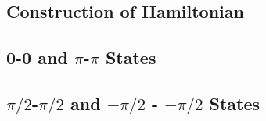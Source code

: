 \documentclass[../../../main.tex]{subfiles}
\begin{document}
\tableofcontents
\newpage

\subsection{Construction of Hamiltonian}


\subsection{0-0 and $\pi$-$\pi$ States}


\subsection{$\pi/2$-$\pi/2$ and $-\pi/2$ - $-\pi/2$ States}






\nocite{*}
\printbibliography
\end{document}
